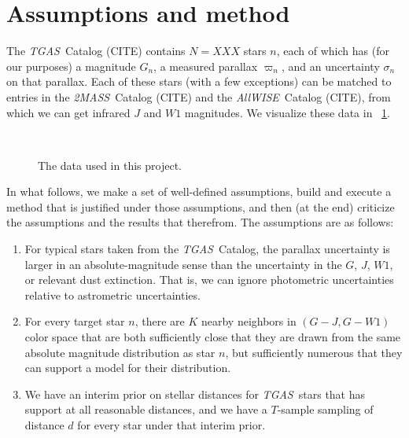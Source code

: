 \documentclass[12pt]{article}
\newcommand{\project}[1]{\textsl{#1}}
\newcommand{\acronym}[1]{\small{#1}}
\newcommand{\tgas}{\project{\acronym{TGAS}}}
\newcommand{\twomass}{\project{\acronym{2MASS}}}
\newcommand{\wise}{\project{All\acronym{WISE}}}
\newcommand{\wone}{W\!\mathit{1}}
\begin{document}
\section{Assumptions and method}

The \tgas\ Catalog (CITE) contains $N=XXX$ stars $n$, each of which has (for
our purposes) a magnitude $G_n$, a measured parallax $\varpi_n$, and
an uncertainty $\sigma_n$ on that parallax.
Each of these stars (with a few exceptions) can be matched to entries
in the \twomass\ Catalog (CITE) and the \wise\ Catalog (CITE), from
which we can get infrared $J$ and $\wone$ magnitudes.
We visualize these data in \figurename~\ref{fig:data}.

\begin{figure}[p]
~~
\caption{The data used in this project.\label{fig:data}}
\end{figure}

In what follows, we make a set of well-defined assumptions, build and
execute a method that is justified under those assumptions, and then
(at the end) criticize the assumptions and the results that therefrom.
The assumptions are as follows:
\begin{enumerate}\itemsep=0ex
\item For typical stars taken from the \tgas\ Catalog, the parallax
  uncertainty is larger in an absolute-magnitude sense than the
  uncertainty in the $G$, $J$, $\wone$, or relevant dust extinction. That
  is, we can ignore photometric uncertainties relative to astrometric
  uncertainties.
\item For every target star $n$, there are $K$ nearby neighbors in
  $(G-J, G-\wone)$ color space that are both sufficiently close that they
  are drawn from the same absolute magnitude distribution as star $n$,
  but sufficiently numerous that they can support a model for their
  distribution.
\item We have an interim prior on stellar distances for \tgas\ stars
  that has support at all reasonable distances, and we have a
  $T$-sample sampling of distance $d$ for every star under that
  interim prior.
\end{enumerate}
\end{document}
